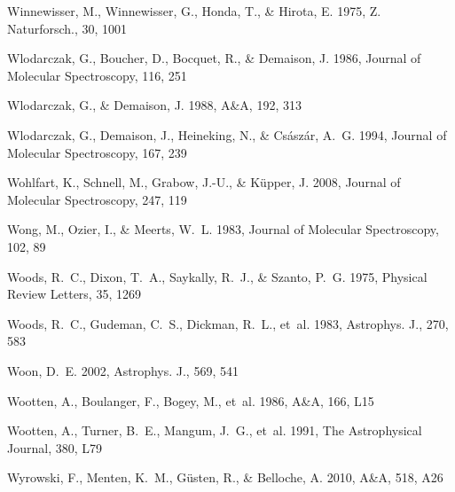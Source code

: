 \documentclass[twocolumn]{aastex631}
\begin{document}
\begin{thebibliography}{}
Winnewisser, M., Winnewisser, G., Honda, T., \& Hirota, E. 1975, Z.
  Naturforsch., 30, 1001

Wlodarczak, G., Boucher, D., Bocquet, R., \& Demaison, J. 1986, Journal of
  Molecular Spectroscopy, 116, 251

Wlodarczak, G., \& Demaison, J. 1988, A{\&}A, 192, 313

Wlodarczak, G., Demaison, J., Heineking, N., \& Cs{\'a}sz{\'a}r, A.~G. 1994,
  Journal of Molecular Spectroscopy, 167, 239

Wohlfart, K., Schnell, M., Grabow, J.-U., \& K{\"u}pper, J. 2008, Journal of
  Molecular Spectroscopy, 247, 119

Wong, M., Ozier, I., \& Meerts, W.~L. 1983, Journal of Molecular Spectroscopy,
  102, 89

Woods, R.~C., Dixon, T.~A., Saykally, R.~J., \& Szanto, P.~G. 1975, Physical
  Review Letters, 35, 1269

Woods, R.~C., Gudeman, C.~S., Dickman, R.~L., {et~al.} 1983, Astrophys. J.,
  270, 583

Woon, D.~E. 2002, Astrophys. J., 569, 541

Wootten, A., Boulanger, F., Bogey, M., {et~al.} 1986, A{\&}A, 166, L15

Wootten, A., Turner, B.~E., Mangum, J.~G., {et~al.} 1991, The Astrophysical
  Journal, 380, L79

Wyrowski, F., Menten, K.~M., G{\"u}sten, R., \& Belloche, A. 2010, A{\&}A, 518,
  A26


\end{thebibliography}
\end{document}
